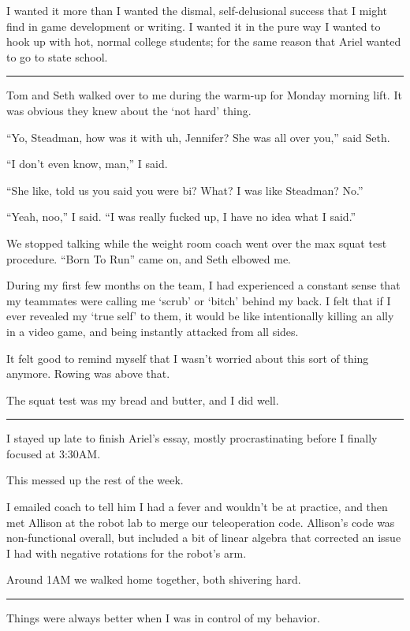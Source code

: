 I wanted it more than I wanted the dismal, self-delusional success that I might
find in game development or writing.  I wanted it in the pure way I wanted to
hook up with hot, normal college students; for the same reason that Ariel
wanted to go to state school. 

\plainfancybreak{12pt}{2}{}

Tom and Seth walked over to me during the warm-up for Monday morning lift.  It
was obvious they knew about the `not hard' thing.  

``Yo, Steadman, how was it with uh, Jennifer?  She was all over you,'' said
Seth.

``I don't even know, man,'' I said.

``She like, told us you said you were bi?  What?  I was like Steadman?
No.''

``Yeah, noo,'' I said. ``I was really fucked up, I have no idea what I said.''

We stopped talking while the weight room coach went over the max squat test
procedure.  ``Born To Run'' came on, and Seth elbowed me. 

During my first few months on the team, I had experienced a constant sense that
my teammates were calling me `scrub' or `bitch' behind my back.  I felt that if
I ever revealed my `true self' to them, it would be like intentionally killing
an ally in a video game, and being instantly attacked from all sides.

It felt good to remind myself that I wasn't worried about this sort of thing
anymore.  Rowing was above that.

The squat test was my bread and butter, and I did well.

\plainfancybreak{12pt}{2}{}

I stayed up late to finish Ariel's essay, mostly procrastinating before I
finally focused at 3:30AM.

This messed up the rest of the week.

I emailed coach to tell him I had a fever and wouldn't be at practice, and then
met Allison at the robot lab to merge our teleoperation code.   Allison's code
was non-functional overall, but included a bit of linear algebra that corrected
an issue I had with negative rotations for the robot's arm.

Around 1AM we walked home together, both shivering hard. 

\plainfancybreak{12pt}{2}{}

Things were always better when I was in control of my behavior.  

